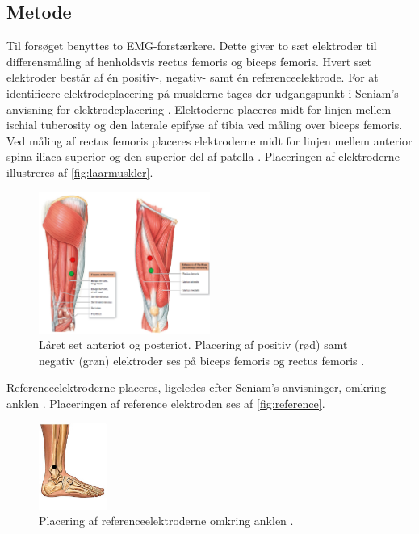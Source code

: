 \subsection{Metode}
Til forsøget benyttes to EMG-forstærkere. Dette giver to sæt elektroder til differensmåling af henholdsvis rectus femoris og biceps femoris. Hvert sæt elektroder består af én positiv-, negativ- samt én referenceelektrode. 
For at identificere elektrodeplacering på musklerne tages der udgangspunkt i Seniam's anvisning for elektrodeplacering \citep{seniam2016}. 
Elektoderne placeres midt for linjen mellem ischial tuberosity og den laterale epifyse af tibia ved måling over biceps femoris. Ved måling af rectus femoris placeres elektroderne midt for linjen mellem anterior spina iliaca superior og den superior del af patella \citep{seniam2016}. Placeringen af elektroderne illustreres af \autoref{fig:laarmuskler}. 

\begin{figure}[H]
\centering
\includegraphics[width=0.5\textwidth]{figures/laarmuskler.png}
\caption{Låret set anteriot og posteriot. Placering af positiv (rød) samt negativ (grøn) elektroder ses på biceps femoris og rectus femoris \citep{martini2012}.}
\label{fig:laarmuskler}
\end{figure}

Referenceelektroderne placeres, ligeledes efter Seniam's anvisninger, omkring anklen \citep{seniam2016}. Placeringen af reference elektroden ses af \autoref{fig:reference}.

\begin{figure}[H]
\centering
\includegraphics[width=0.2\textwidth]{figures/reference.png}
\caption{Placering af referenceelektroderne omkring anklen \citep{ankle2016}.}
\label{fig:reference}
\end{figure}

